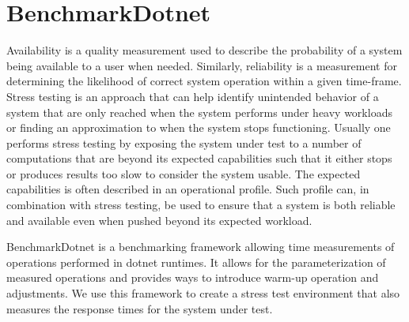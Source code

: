 \section*{BenchmarkDotnet}
Availability is a quality measurement used to describe the probability of a system being available to a user when needed. Similarly, reliability is a measurement for determining the likelihood of correct system operation within a given time-frame. \cite{reliabilityAvailability}
Stress testing is an approach that can help identify unintended behavior of a system that are only reached when the system performs under heavy workloads or finding an approximation to when the system stops functioning.
Usually one performs stress testing by exposing the system under test to a number of computations that are beyond its expected capabilities such that it either stops or produces results too slow to consider the system usable\cite{Sommerville10}. 
The expected capabilities is often described in an operational profile\cite{OperationalProfiles}. 
Such profile can, in combination with stress testing, be used to ensure that a system is both reliable and available even when pushed beyond its expected workload.

BenchmarkDotnet\cite{Benchmarkdotnet} is a benchmarking framework allowing time measurements of operations performed in dotnet runtimes. 
It allows for the parameterization of measured operations and provides ways to introduce warm-up operation and adjustments. 
We use this framework to create a stress test environment that also measures the response times for the system under test. 
